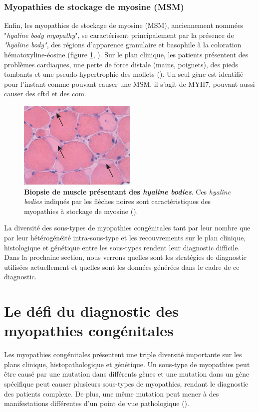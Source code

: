 \subsubsection{Myopathies de stockage de myosine (MSM)}
Enfin, les myopathies de stockage de myosine (MSM), anciennement nommées "\textit{hyaline body myopathy}", se caractérisent principalement par la présence de \textit{"hyaline body"}, des régions d'apparence granulaire et basophile à la coloration hématoxyline-éosine (figure \ref{fig:hyaline}, \cite{claeys_congenital_2020, victor_dubowitz_muscle_2020}). Sur le plan clinique, les patients présentent des problèmes cardiaques, une perte de force distale (mains, poignets), des pieds tombants et une pseudo-hypertrophie des mollets (\cite{cassandrini_congenital_2017}). Un seul gène est identifié pour l'instant comme pouvant causer une MSM, il s'agit de MYH7, pouvant aussi causer des \gls{cftd} et des \gls{com}.
\begin{figure}[!ht]
 \centering
 \includegraphics[width=0.5\textwidth]{figures/hyalin.jpg}
 \caption[Biopsie de muscle des \textit{hyaline bodies}]{\textbf{Biopsie de muscle présentant des \textit{hyaline bodies}}. Ces \textit{hyaline bodies} indiqués par les flèches noires sont caractéristiques des myopathies à stockage de myosine (\cite{victor_dubowitz_muscle_2020}).}
 \label{fig:hyaline}
\end{figure}

La diversité des sous-types de myopathies congénitales tant par leur nombre que par leur hétérogénéité intra-sous-type et les recouvrements sur le plan clinique, histologique et génétique entre les sous-types rendent leur diagnostic difficile. Dans la prochaine section, nous verrons quelles sont les stratégies de diagnostic utilisées actuellement et quelles sont les données générées dans le cadre de ce diagnostic.

\section{Le défi du diagnostic des myopathies congénitales}
Les myopathies congénitales présentent une triple diversité importante sur les plans clinique, histopathologique et génétique. Un sous-type de myopathies peut être causé par une mutation dans différents gènes et une mutation dans un gène spécifique peut causer plusieurs sous-types de myopathies, rendant le diagnostic des patients complexe. De plus, une même mutation peut mener à des manifestations différentes d'un point de vue pathologique (\cite{north_approach_2014}). 

